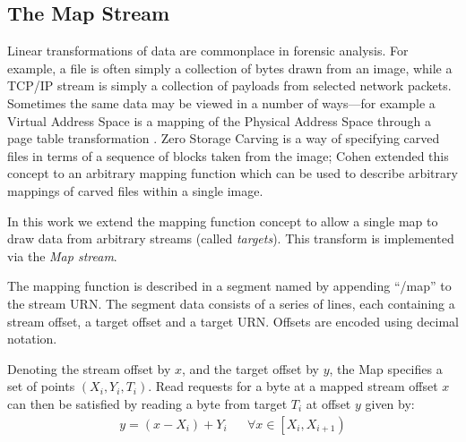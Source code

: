 \documentclass[10pt, conference]{IEEEtran}
\begin{document}


\subsection{The Map Stream}
\label{map_stream}
Linear transformations of data are commonplace in forensic
analysis. For example, a file is often simply a collection of bytes
drawn from an image, while a TCP/IP stream is simply a collection of
payloads from selected network packets. Sometimes the same data may be
viewed in a number of ways---for example a Virtual Address Space is a
mapping of the Physical Address Space through a page table
transformation \cite{Tanenbaum2008}.  Zero Storage
Carving\cite{Meijer2006} is a way of specifying carved files in terms
of a sequence of blocks taken from the image; Cohen extended this
concept to an arbitrary mapping function\cite{1363239,Cohen2007} which
can be used to describe arbitrary mappings of carved files within a
single image.

In this work we extend the mapping function concept to allow a single
map to draw data from arbitrary streams (called {\em targets}). This
transform is implemented via the {\em Map stream}.

The mapping function is described in a segment named by appending
``/map'' to the stream URN. The segment data consists of a series of
lines, each containing a stream offset, a target offset and a target
URN. Offsets are encoded using decimal notation.

Denoting the stream offset by $x$, and the target offset by $y$, the
Map specifies a set of points $(X_i,Y_i,T_i)$. Read requests for a
byte at a mapped stream offset $x$ can then be satisfied by reading a
byte from target $T_i$ at offset $y$ given by:
\begin{eqnarray}
y = (x - X_i) + Y_i & &
\forall x \in \left [X_i, X_{i+1} \right )
\end{eqnarray}
\end{document}
